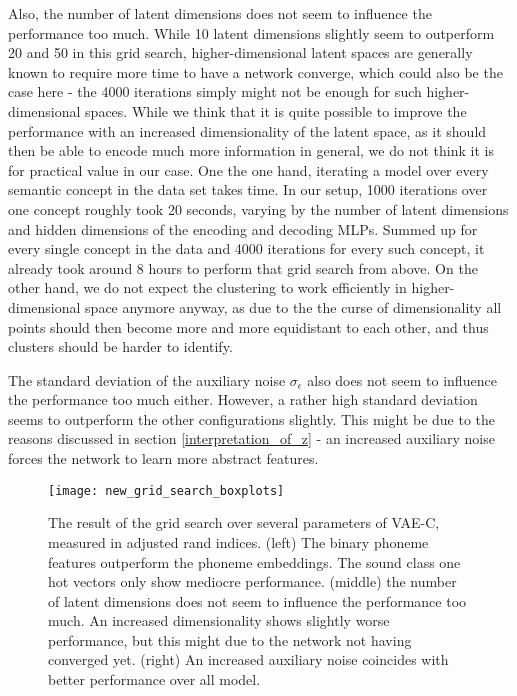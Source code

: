 \documentclass[6pt]{article}
\begin{document}
Also, the number of latent dimensions does not seem to influence the performance too much. While 10 latent dimensions slightly seem to outperform 20 and 50 in this grid search, higher-dimensional latent spaces are generally known to require more time to have a network converge, which could also be the case here - the 4000 iterations simply might not be enough for such higher-dimensional spaces. While we think that it is quite possible to improve the performance with an increased dimensionality of the latent space, as it should then be able to encode much more information in general, we do not think it is for practical value in our case. One the one hand, iterating a model over every semantic concept in the data set takes time. In our setup, 1000 iterations over one concept roughly took 20 seconds, varying by the number of latent dimensions and hidden dimensions of the encoding and decoding MLPs. Summed up for every single concept in the data and 4000 iterations for every such concept, it already took around 8 hours to perform that grid search from above. On the other hand, we do not expect the clustering to work efficiently in higher-dimensional space anymore anyway, as due to the the curse of dimensionality all points should then become more and more equidistant to each other, and thus clusters should be harder to identify. %

The standard deviation of the auxiliary noise $\sigma_{\epsilon}$ also does not seem to influence the performance too much either. However, a rather high standard deviation seems to outperform the other configurations slightly. This might be due to the reasons discussed in section \ref{interpretation_of_z} - an increased auxiliary noise forces the network to learn more abstract features.

 \begin{figure}[h!] 
     \texttt{[image: new\_grid\_search\_boxplots]} 
     \caption{The result of the grid search over several parameters of VAE-C, measured in adjusted rand indices. (left) The binary phoneme features outperform the phoneme embeddings. The sound class one hot vectors only show mediocre performance. (middle) the number of latent dimensions does not seem to influence the performance too much. An increased dimensionality shows slightly worse performance, but this might due to the network not having converged yet. (right) An increased auxiliary noise coincides with better performance over all model.}
    \label{fig:grid_search_boxplots} 
\end{figure}
\end{document}
